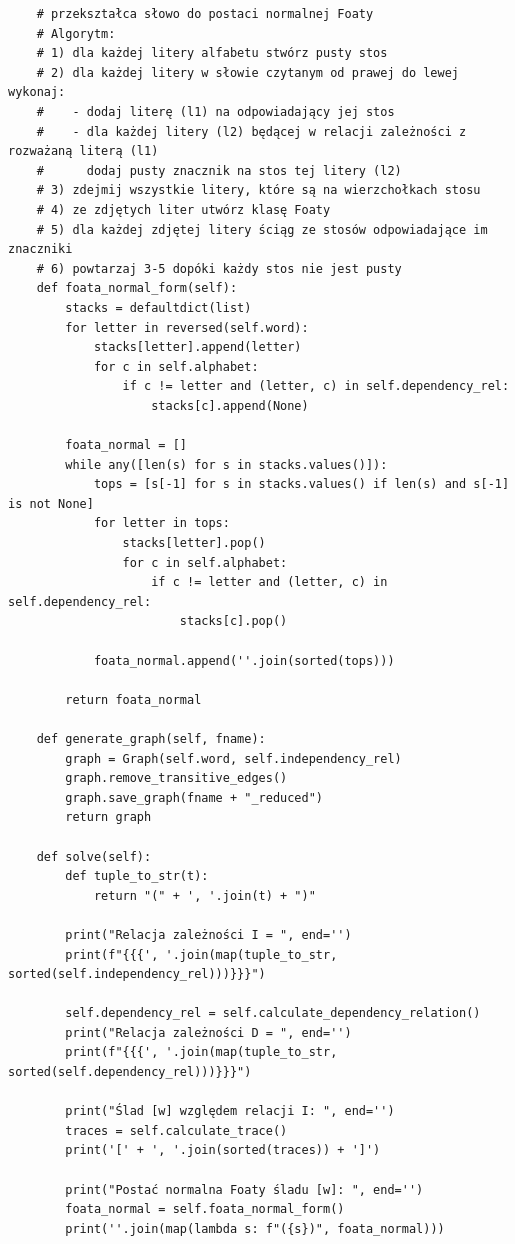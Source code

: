 \documentclass[12pt]{article}
\begin{document}
\begin{verbatim}
    # przekształca słowo do postaci normalnej Foaty
    # Algorytm:
    # 1) dla każdej litery alfabetu stwórz pusty stos
    # 2) dla każdej litery w słowie czytanym od prawej do lewej wykonaj:
    #    - dodaj literę (l1) na odpowiadający jej stos
    #    - dla każdej litery (l2) będącej w relacji zależności z rozważaną literą (l1)
    #      dodaj pusty znacznik na stos tej litery (l2)
    # 3) zdejmij wszystkie litery, które są na wierzchołkach stosu
    # 4) ze zdjętych liter utwórz klasę Foaty
    # 5) dla każdej zdjętej litery ściąg ze stosów odpowiadające im znaczniki
    # 6) powtarzaj 3-5 dopóki każdy stos nie jest pusty
    def foata_normal_form(self):
        stacks = defaultdict(list)
        for letter in reversed(self.word):
            stacks[letter].append(letter)
            for c in self.alphabet:
                if c != letter and (letter, c) in self.dependency_rel:
                    stacks[c].append(None)

        foata_normal = []
        while any([len(s) for s in stacks.values()]):
            tops = [s[-1] for s in stacks.values() if len(s) and s[-1] is not None]
            for letter in tops:
                stacks[letter].pop()
                for c in self.alphabet:
                    if c != letter and (letter, c) in self.dependency_rel:
                        stacks[c].pop()

            foata_normal.append(''.join(sorted(tops)))

        return foata_normal

    def generate_graph(self, fname):
        graph = Graph(self.word, self.independency_rel)
        graph.remove_transitive_edges()
        graph.save_graph(fname + "_reduced")
        return graph

    def solve(self):
        def tuple_to_str(t):
            return "(" + ', '.join(t) + ")"

        print("Relacja zależności I = ", end='')
        print(f"{{{', '.join(map(tuple_to_str, sorted(self.independency_rel)))}}}")

        self.dependency_rel = self.calculate_dependency_relation()
        print("Relacja zależności D = ", end='')
        print(f"{{{', '.join(map(tuple_to_str, sorted(self.dependency_rel)))}}}")

        print("Ślad [w] względem relacji I: ", end='')
        traces = self.calculate_trace()
        print('[' + ', '.join(sorted(traces)) + ']')

        print("Postać normalna Foaty śladu [w]: ", end='')
        foata_normal = self.foata_normal_form()
        print(''.join(map(lambda s: f"({s})", foata_normal)))


\end{verbatim}
\end{document}
